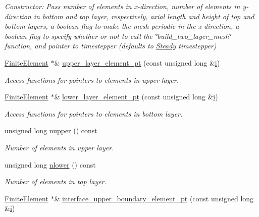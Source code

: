 \begin{DoxyCompactItemize}
\begin{DoxyCompactList}\small\item\em Constructor\+: Pass number of elements in x-\/direction, number of elements in y-\/direction in bottom and top layer, respectively, axial length and height of top and bottom layers, a boolean flag to make the mesh periodic in the x-\/direction, a boolean flag to specify whether or not to call the \char`\"{}build\+\_\+two\+\_\+layer\+\_\+mesh\char`\"{} function, and pointer to timestepper (defaults to \hyperlink{classoomph_1_1Steady}{Steady} timestepper) \end{DoxyCompactList}\item 
\hyperlink{classoomph_1_1FiniteElement}{Finite\+Element} $\ast$\& \hyperlink{classoomph_1_1TwoLayerSpineMesh_a36680574d0c8f023206ce8ffe1a99b06}{upper\+\_\+layer\+\_\+element\+\_\+pt} (const unsigned long \&\hyperlink{cfortran_8h_adb50e893b86b3e55e751a42eab3cba82}{i})
\begin{DoxyCompactList}\small\item\em Access functions for pointers to elements in upper layer. \end{DoxyCompactList}\item 
\hyperlink{classoomph_1_1FiniteElement}{Finite\+Element} $\ast$\& \hyperlink{classoomph_1_1TwoLayerSpineMesh_a37e08f5f396767bdad632d9b8022655a}{lower\+\_\+layer\+\_\+element\+\_\+pt} (const unsigned long \&\hyperlink{cfortran_8h_adb50e893b86b3e55e751a42eab3cba82}{i})
\begin{DoxyCompactList}\small\item\em Access functions for pointers to elements in bottom layer. \end{DoxyCompactList}\item 
unsigned long \hyperlink{classoomph_1_1TwoLayerSpineMesh_a7d92e162c4fd6e70627982f761d1a66c}{nupper} () const
\begin{DoxyCompactList}\small\item\em Number of elements in upper layer. \end{DoxyCompactList}\item 
unsigned long \hyperlink{classoomph_1_1TwoLayerSpineMesh_acc617bc2ae9ee4c5084c8fb004a0b1a4}{nlower} () const
\begin{DoxyCompactList}\small\item\em Number of elements in top layer. \end{DoxyCompactList}\item 
\hyperlink{classoomph_1_1FiniteElement}{Finite\+Element} $\ast$\& \hyperlink{classoomph_1_1TwoLayerSpineMesh_a35411cf1e85ed2681e8b91f42a205150}{interface\+\_\+upper\+\_\+boundary\+\_\+element\+\_\+pt} (const unsigned long \&\hyperlink{cfortran_8h_adb50e893b86b3e55e751a42eab3cba82}{i})

\end{DoxyCompactItemize}

